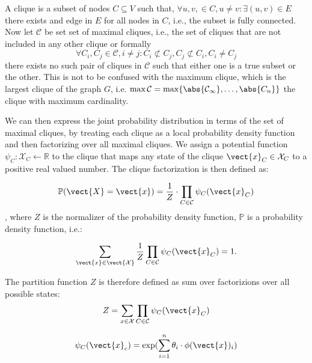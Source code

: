 A clique is a subset of nodes $C \subseteq V$ such that, $\forall u,v,  \in C, u \neq v: \exists (u,v) \in E$ there exists and edge in $E$ for all nodes in $C$, i.e., the subset is fully connected.
Now let $\mathcal{C}$ be set set of maximal cliques, i.e., the set of cliques that are not included in any other clique or formally 
\begin{equation}
    \forall C_i, C_j \in \mathcal{C}, i \neq j  : C_i \not\subset C_j, C_j \not\subset C_i, C_i \neq C_j
\end{equation}
there exists no such pair of cliques in $\mathcal{C}$ such that either one is a true subset or the other.
This is not to be confused with the maximum clique, which is the largest clique of the graph $G$, i.e. $\max \mathcal{C} = \max \{\abs{\mathcal{C_1}}, \ldots, \abs{C_n}\}$ the clique with maximum cardinality.

We can then express the joint probability distribution in terms of the set of maximal cliques, by treating each clique as a local probability density function and then factorizing over all maximal cliques. 
We assign a potential function $\psi_C: \mathcal{X}_C \leftarrow \mathbb{R}$ to the clique that maps any state of the clique $\vect{x}_C \in \mathcal{X}_C$ to a positive real valued number.
The clique factorization is then defined as:

\begin{equation}
    \mathbb{P}(\vect{X}=\vect{x}) = \frac{1}{Z} \cdot \prod_{C \in \mathcal{C}} \psi_C(\vect{x}_C)
\end{equation},
where $Z$ is the normalizer of the probability density function, $\mathbb{P}$ is a probability density function, i.e.:

\begin{equation}
    \sum_{\vect{x}\in \mathcal{\vect{X}}}   \frac{1}{Z} \prod_{C \in \mathcal{C}} \psi_C(\vect{x}_C)  = 1.
\end{equation}

The partition function $Z$ is therefore defined as sum over factorizions over all possible states:
\begin{equation}
    Z = \sum_{x\in \mathcal{X}} \prod_{C \in \mathcal{C}} \psi_C(\vect{x}_C)
\end{equation}

\begin{equation}
    \psi_C(\vect{x}_c) = \exp(\sum_{i=1}^n \theta_i \cdot \phi(\vect{x})_i)
\end{equation}

